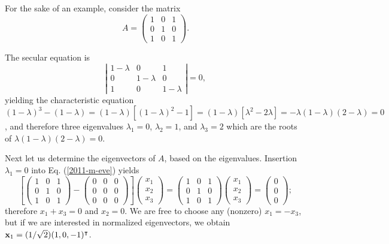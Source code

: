 {\color{blue}
\bexample
For the sake of an example, consider  the
{matrix}
\begin{equation}
A=
\begin{pmatrix}
1&0&1\\
0&1&0\\
1&0&1
\end{pmatrix}.
\label{2017-m-ch-fdvs-e-eev1}
\end{equation}

The secular equation is
$$
\left|
\begin{matrix}
1-\lambda &0&1\\
0&1-\lambda &0\\
1&0&1-\lambda
\end{matrix}
\right| = 0,
$$
yielding the characteristic equation
$
(1-\lambda )^3 -(1-\lambda ) =(1-\lambda )[(1-\lambda )^2 - 1]=(1-\lambda )[\lambda ^2 - 2\lambda ]= - \lambda (1-\lambda )(2-\lambda ) =0$,
and therefore three  eigenvalues
$\lambda_1=0$,
$\lambda_2=1$, and
$\lambda_3=2$ which are the roots of $\lambda (1-\lambda )(2-\lambda ) =0$.

Next let us determine the eigenvectors of $A$, based on the eigenvalues.
Insertion  $\lambda_1=0$ into Eq. (\ref{2011-m-eve}) yields
\begin{equation}
\left[
\begin{pmatrix}
1&0&1\\
0&1&0\\
1&0&1
\end{pmatrix}  -
\begin{pmatrix}
0&0&0\\
0&0&0\\
0&0&0
\end{pmatrix}
\right]
\begin{pmatrix}
x_1\\
x_2\\
x_3
\end{pmatrix}
=
\begin{pmatrix}
1&0&1\\
0&1&0\\
1&0&1
\end{pmatrix}
\begin{pmatrix}
x_1\\
x_2\\
x_3
\end{pmatrix}
=
\begin{pmatrix}
0\\
0\\
0
\end{pmatrix}
;
\end{equation}
therefore $x_1+x_3=0$ and $x_2=0$.
We are free to choose any (nonzero) $x_1=-x_3$,
but if we are interested in normalized eigenvectors, we obtain
${\bf x}_1 =(1/\sqrt{2})(1,0,-1)^\intercal $.

}
